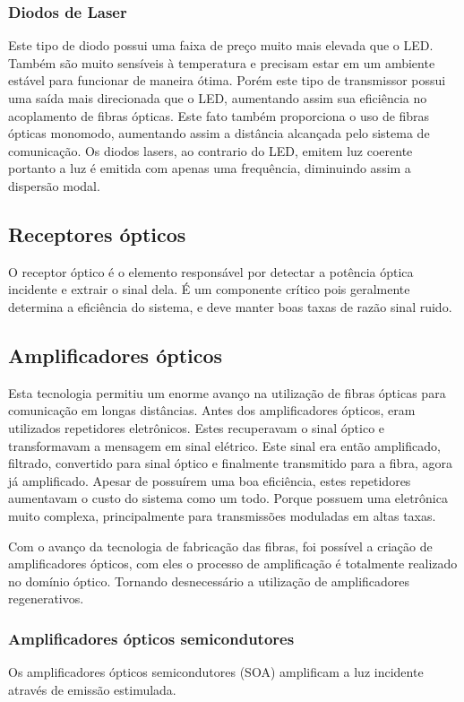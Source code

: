 \documentclass[article]{IEEEtran}
\begin{document}
\subsubsection{Diodos de Laser}
Este tipo de diodo possui uma faixa de preço muito mais elevada que o LED. Também são muito sensíveis à temperatura e precisam estar em um ambiente estável para funcionar de maneira ótima. 
Porém este tipo de transmissor possui uma saída mais direcionada que o LED, aumentando assim sua eficiência no acoplamento de fibras ópticas. Este fato também proporciona o uso de fibras ópticas monomodo, aumentando assim a distância alcançada pelo sistema de comunicação. Os diodos lasers, ao contrario do LED, emitem luz coerente portanto a luz é emitida com apenas uma frequência, diminuindo assim a dispersão modal. \cite{TRANSMITTERS}

\subsection{Receptores ópticos}
O receptor óptico é o elemento responsável por detectar a potência óptica incidente e extrair o sinal dela. É um componente crítico pois geralmente determina a eficiência do sistema, e deve manter boas taxas de razão sinal ruido.\cite{RECEIVER}

\subsection{Amplificadores ópticos}
\par Esta tecnologia permitiu um enorme avanço na utilização de fibras ópticas para comunicação em longas distâncias. Antes dos amplificadores ópticos, eram utilizados repetidores eletrônicos. Estes recuperavam o sinal óptico e transformavam a mensagem em sinal elétrico. Este sinal era então amplificado, filtrado, convertido para sinal óptico e finalmente transmitido para a fibra, agora já amplificado. Apesar de possuírem uma boa eficiência, estes repetidores aumentavam o custo do sistema como um todo. Porque possuem uma eletrônica muito complexa, principalmente para transmissões moduladas em altas taxas.
\par Com o avanço da tecnologia de fabricação das fibras, foi possível a criação de amplificadores ópticos, com eles o processo de amplificação é totalmente realizado no domínio óptico. Tornando desnecessário a utilização de amplificadores regenerativos.
\subsubsection{Amplificadores ópticos semicondutores}
Os amplificadores ópticos semicondutores (SOA) amplificam a luz incidente através de emissão estimulada.
\end{document}
